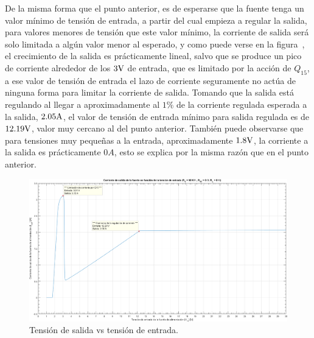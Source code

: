 \vspace{1.5cm}

De la misma forma que el punto anterior, es de esperarse que la fuente tenga un valor mínimo de tensión de entrada, a partir del cual empieza a regular la salida, para valores menores de tensión que este valor mínimo, la corriente de salida será solo limitada a algún valor menor al esperado, y como puede verse en la figura~, el crecimiento de la salida es prácticamente lineal, salvo que se produce un pico de corriente alrededor de los $3 \si[per-mode=symbol]{\volt}$ de entrada, que es limitado por la acción de $Q_{15}$, a ese valor de tensión de entrada el lazo de corriente seguramente no actúa de ninguna forma para limitar la corriente de salida. Tomando que la salida está regulando al llegar a aproximadamente al $1 \%$ de la corriente regulada esperada a la salida, $2.05 \si[per-mode=symbol]{\ampere}$, el valor de tensión de entrada mínimo para salida regulada es de $12.19 \si[per-mode=symbol]{\volt}$, valor muy cercano al del punto anterior. También puede observarse que para tensiones muy pequeñas a la entrada, aproximadamente $1.8 \si[per-mode=symbol]{\volt}$, la corriente a la salida es prácticamente $0 A$, esto se explica por la misma razón que en el punto anterior.

\vfill

\clearpage

\begin{figure}[H] %
\begin{center}
\includegraphics[width=1.2 \textwidth, angle=90]{./img/preguntas/p19.png}
\caption{\label{fig:fig_p19_io_vs_vi}\footnotesize{Tensión de salida vs tensión de entrada.}}
\end{center}
\end{figure}

\clearpage